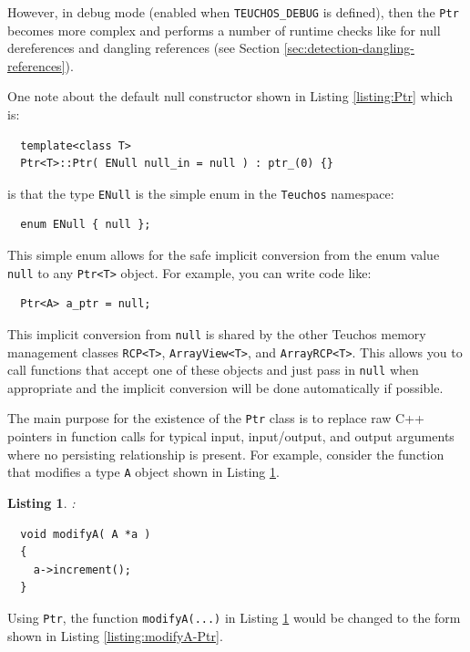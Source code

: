 \documentclass[pdf,ps2pdf,11pt]{SANDreport}
\newtheorem{listing}{Listing}
\begin{document}
However, in debug mode (enabled when {}\texttt{TEUCHOS\_DEBUG} is
defined), then the {}\texttt{Ptr} becomes more complex and performs a
number of runtime checks like for null dereferences and dangling
references (see Section {}\ref{sec:detection-dangling-references}).

One note about the default null constructor shown in Listing
{}\ref{listing:Ptr} which is:

{\small\begin{verbatim}
  template<class T>
  Ptr<T>::Ptr( ENull null_in = null ) : ptr_(0) {}
\end{verbatim}}

{}\noindent{}is that the type {}\texttt{ENull} is the simple enum in
the {}\texttt{Teuchos} namespace:

{\small\begin{verbatim}
  enum ENull { null };
\end{verbatim}}

This simple enum allows for the safe implicit conversion from the enum
value {}\texttt{null} to any {}\texttt{Ptr<T>} object.  For example,
you can write code like:

{\small\begin{verbatim}
  Ptr<A> a_ptr = null;
\end{verbatim}}

This implicit conversion from {}\texttt{null} is shared by the other
Teuchos memory management classes {}\texttt{RCP<T>},
{}\texttt{ArrayView<T>}, and {}\texttt{ArrayRCP<T>}.  This allows you
to call functions that accept one of these objects and just pass in
{}\texttt{null} when appropriate and the implicit conversion will be
done automatically if possible.

The main purpose for the existence of the {}\texttt{Ptr} class is to
replace raw C++ pointers in function calls for typical input,
input/output, and output arguments where no persisting relationship is
present.  For example, consider the function that modifies a type
{}\texttt{A} object shown in Listing {}\ref{listing:modifyA-rawPtr}.

\begin{listing}:\\
\label{listing:modifyA-rawPtr}
{\small\begin{verbatim}
  void modifyA( A *a )
  {
    a->increment();
  }
\end{verbatim}}
\end{listing}

Using {}\texttt{Ptr}, the function {}\texttt{modifyA(...)} in Listing
{}\ref{listing:modifyA-rawPtr} would be changed to the form shown in
Listing {}\ref{listing:modifyA-Ptr}.
\end{document}
